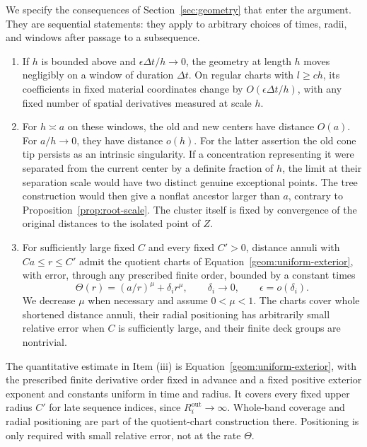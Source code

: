 We specify the consequences of Section~\ref{sec:geometry} that enter the
argument.  They are sequential statements: they apply to arbitrary choices
of times, radii, and windows after passage to a subsequence.
\begin{enumerate}[label=(\roman*)]
\item If $h$ is bounded above and $\epsilon\Delta t/h\to0$, the geometry
at length $h$ moves negligibly on a window of duration $\Delta t$.
On regular charts with $l\ge c h$, its coefficients in fixed material
coordinates change by $O(\epsilon\Delta t/h)$, with any fixed number of
spatial derivatives measured at scale $h$.
\item For $h\asymp a$ on these windows, the old and new centers have
distance $O(a)$.  For $a/h\to0$, they have distance $o(h)$.
For the latter assertion the old cone tip persists as an intrinsic
singularity.  If a concentration representing it were separated from the
current center by a definite fraction of $h$, the limit at their separation
scale would have two distinct genuine exceptional points.  The tree
construction would then give a nonflat ancestor larger than $a$,
contrary to Proposition~\ref{prop:root-scale}.  The cluster itself is fixed
by convergence of the original distances to the isolated point of $Z$.
\item For sufficiently large fixed $C$ and every fixed $C'>0$, distance
annuli with $Ca\le r\le C'$ admit the quotient charts of
Equation~\eqref{geom:uniform-exterior}, with error, through any prescribed finite
order, bounded by a constant times
\begin{equation}
 \Theta(r)=(a/r)^\mu+\delta_i r^\mu,
 \qquad \delta_i\longrightarrow0,
 \qquad \epsilon=o(\delta_i).
 \label{para:theta}
\end{equation}
We decrease $\mu$ when necessary and assume $0<\mu<1$.
The charts cover whole shortened distance annuli, their radial positioning
has arbitrarily small relative error when $C$ is sufficiently large, and
their finite deck groups are nontrivial.
\end{enumerate}
The quantitative estimate in Item (iii) is
Equation~\eqref{geom:uniform-exterior}, with the prescribed finite derivative
order fixed in advance and a fixed positive exterior exponent and constants
uniform in time and radius.  It covers every fixed upper radius $C'$ for
late sequence indices, since $R_i^{\mathrm{out}}\to\infty$.
Whole-band coverage and radial positioning are part of the quotient-chart
construction there.  Positioning is only required with small relative
error, not at the rate $\Theta$.

